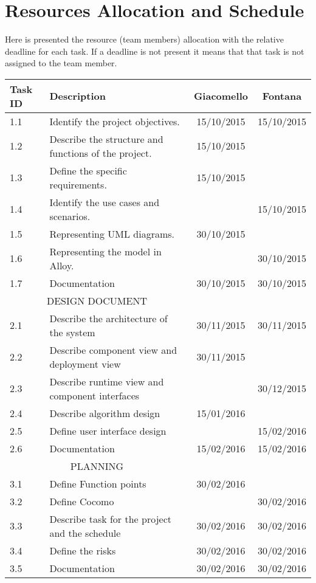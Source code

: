 \documentclass[11pt, a4paper,titlepage]{article}
\begin{document}
	\section{Resources Allocation and Schedule}
	Here is presented the resource (team members) allocation with the relative deadline for each task. If a deadline is not present it means that that task is not assigned to the team member.
	\newline
	\newline
	\begin{tabularx}{\textwidth}{|l|X|c|c|}
		\hline
		\textbf{Task ID} &	\textbf{Description} & \textbf{Giacomello} & \textbf{Fontana} \\
		\hline
		1.1	 & Identify the project objectives. &  15/10/2015 & 15/10/2015 \\
		1.2 & Describe the structure and functions of the project.  & 15/10/2015  &  \\
		1.3 & 	Define the specific requirements. & 15/10/2015  &  \\
		1.4 & 	Identify the use cases and scenarios. &   & 15/10/2015 \\
		1.5 & 	Representing UML diagrams. & 30/10/2015 &  \\
		1.6 & 	Representing the model in Alloy. &   & 30/10/2015 \\
		1.7 & 	Documentation &  30/10/2015 & 30/10/2015 \\
		\hline
		\multicolumn{2}{c}{DESIGN DOCUMENT} &  & \\
		\hline
		2.1 & 	Describe the architecture of the system & 30/11/2015  & 30/11/2015 \\
		2.2 & 	Describe component view and deployment view & 30/11/2015  &  \\
		2.3 & 	Describe runtime view and component interfaces &   & 30/12/2015 \\
		2.4 & 	Describe algorithm design & 15/01/2016  &  \\ 
		2.5 & 	Define user interface design &   & 15/02/2016 \\
		2.6 & 	Documentation & 15/02/2016  & 15/02/2016 \\
		\hline
		\multicolumn{2}{c}{PLANNING} &  & 	\\
		\hline
		3.1 &	Define Function points & 30/02/2016 &  \\
		3.2 & 	Define Cocomo &   & 30/02/2016 \\
		3.3 & 	Describe task for the project and the schedule &  30/02/2016 & 30/02/2016 \\
		3.4 & 	Define the risks & 30/02/2016  & 30/02/2016 \\
		3.5 & 	Documentation & 30/02/2016 & 30/02/2016 \\
		\hline
			\end{tabularx}
\end{document}
